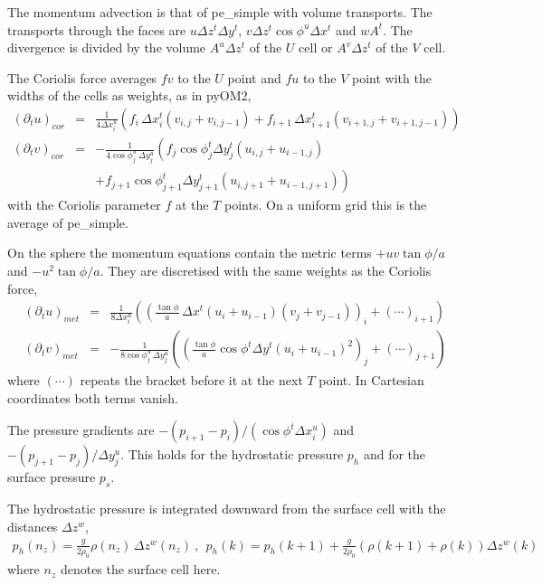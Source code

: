 \documentclass[12pt]{article}
\newcommand{\beq}  { \begin{eqnarray} }
\newcommand{\eeq}  { \end{eqnarray}}
\newcommand{\pt}[1]{{\partial_t #1}}
\newcommand{\lk}{\left(}
\newcommand{\rk}{\right)}
\begin{document}
The momentum advection is that of pe\_simple with volume transports.
The transports through the faces are $u \Delta z^t \Delta y^t$, $v \Delta z^t \cos \phi^u \Delta x^t$ and $w A^t$.
The divergence is divided by the volume $A^u \Delta z^t$ of the $U$ cell or $A^v \Delta z^t$ of the $V$ cell.

The Coriolis force averages $f v$ to the $U$ point and $f u$ to the $V$ point with the widths of the cells as weights, as in pyOM2,
\beq
 (\pt u)_{cor} &=& \frac{1}{4 \Delta x^u_i} \lk
   f_i\, \Delta x^t_i \lk v_{i,j} + v_{i,j-1} \rk
 + f_{i+1}\, \Delta x^t_{i+1} \lk v_{i+1,j} + v_{i+1,j-1} \rk \rk
 \\
 (\pt v)_{cor} &=& - \frac{1}{4 \cos \phi^u_j\, \Delta y^u_j} \lk
   f_j \cos \phi^t_j \Delta y^t_j \lk u_{i,j} + u_{i-1,j} \rk \right. \nonumber \\
 && \left. + f_{j+1} \cos \phi^t_{j+1} \Delta y^t_{j+1} \lk u_{i,j+1} + u_{i-1,j+1} \rk \rk
\eeq
with the Coriolis parameter $f$ at the $T$ points.
On a uniform grid this is the average of pe\_simple.

On the sphere the momentum equations contain the metric terms $+u v \tan \phi /a$ and $-u^2 \tan \phi /a$.
They are discretised with the same weights as the Coriolis force,
\beq
 (\pt u)_{met} &=& \frac{1}{8 \Delta x^u_i} \lk
   \lk \frac{\tan \phi}{a}\, \Delta x^t (u_i + u_{i-1})(v_j + v_{j-1}) \rk_i
 + \lk \cdots \rk_{i+1} \rk
 \\
 (\pt v)_{met} &=& - \frac{1}{8 \cos \phi^u_j\, \Delta y^u_j} \lk
   \lk \frac{\tan \phi}{a} \cos \phi^t \Delta y^t (u_i + u_{i-1})^2 \rk_j
 + \lk \cdots \rk_{j+1} \rk
\eeq
where $(\cdots)$ repeats the bracket before it at the next $T$ point.
In Cartesian coordinates both terms vanish.

The pressure gradients are $-(p_{i+1}-p_i)/(\cos \phi^t \Delta x^u_i)$ and $-(p_{j+1}-p_j)/\Delta y^u_j$.
This holds for the hydrostatic pressure $p_h$ and for the surface pressure $p_s$.

The hydrostatic pressure is integrated downward from the surface cell with the distances $\Delta z^w$,
\beq
 p_h(n_z) = \frac{g}{2 \rho_0} \rho(n_z)\, \Delta z^w(n_z) ~,~~
 p_h(k) = p_h(k+1) + \frac{g}{2 \rho_0} \lk \rho(k+1) + \rho(k) \rk \Delta z^w(k)
\eeq
where $n_z$ denotes the surface cell here.
\end{document}
